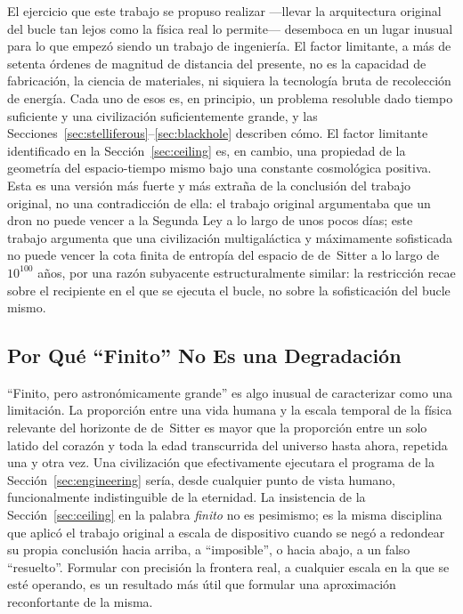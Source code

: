 \documentclass[11pt]{article}
\begin{document}
El ejercicio que este trabajo se propuso realizar —llevar la arquitectura original del bucle tan lejos como la física real lo permite— desemboca en un lugar inusual para lo que empezó siendo un trabajo de ingeniería. El factor limitante, a más de setenta órdenes de magnitud de distancia del presente, no es la capacidad de fabricación, la ciencia de materiales, ni siquiera la tecnología bruta de recolección de energía. Cada uno de esos es, en principio, un problema resoluble dado tiempo suficiente y una civilización suficientemente grande, y las Secciones~\ref{sec:stelliferous}--\ref{sec:blackhole} describen cómo. El factor limitante identificado en la Sección~\ref{sec:ceiling} es, en cambio, una propiedad de la geometría del espacio-tiempo mismo bajo una constante cosmológica positiva. Esta es una versión más fuerte y más extraña de la conclusión del trabajo original, no una contradicción de ella: el trabajo original argumentaba que un dron no puede vencer a la Segunda Ley a lo largo de unos pocos días; este trabajo argumenta que una civilización multigaláctica y máximamente sofisticada no puede vencer la cota finita de entropía del espacio de de~Sitter a lo largo de $10^{100}$ años, por una razón subyacente estructuralmente similar: la restricción recae sobre el recipiente en el que se ejecuta el bucle, no sobre la sofisticación del bucle mismo.

\subsection{Por Qué ``Finito'' No Es una Degradación}

``Finito, pero astronómicamente grande'' es algo inusual de caracterizar como una limitación. La proporción entre una vida humana y la escala temporal de la física relevante del horizonte de de~Sitter es mayor que la proporción entre un solo latido del corazón y toda la edad transcurrida del universo hasta ahora, repetida una y otra vez. Una civilización que efectivamente ejecutara el programa de la Sección~\ref{sec:engineering} sería, desde cualquier punto de vista humano, funcionalmente indistinguible de la eternidad. La insistencia de la Sección~\ref{sec:ceiling} en la palabra \emph{finito} no es pesimismo; es la misma disciplina que aplicó el trabajo original a escala de dispositivo cuando se negó a redondear su propia conclusión hacia arriba, a ``imposible'', o hacia abajo, a un falso ``resuelto''. Formular con precisión la frontera real, a cualquier escala en la que se esté operando, es un resultado más útil que formular una aproximación reconfortante de la misma.
\end{document}
